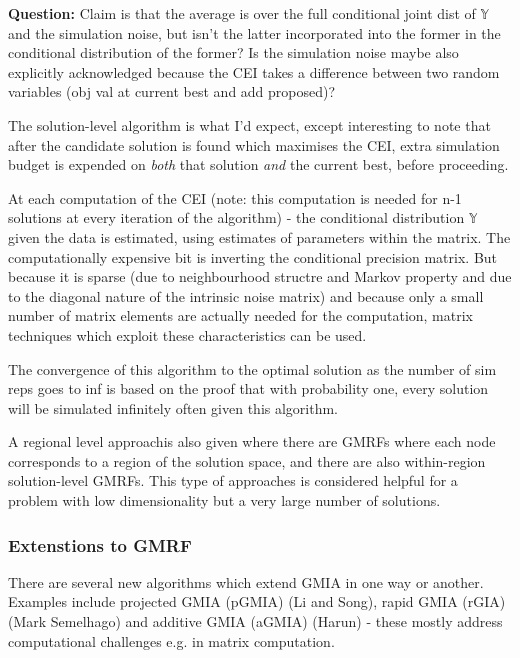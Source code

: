 \documentclass{article}
\begin{document}
\textbf{Question: } Claim is that the average is over the full conditional joint dist of $\mathbb{Y}$ and the simulation noise, but isn't the latter incorporated into the former in the conditional distribution of the former? Is the simulation noise maybe also explicitly acknowledged because the CEI takes a difference between two random variables (obj val at current best and add proposed)? \newline

The solution-level algorithm is what I'd expect, except interesting to note that after the candidate solution is found which maximises the CEI, extra simulation budget is expended on \emph{both} that solution \emph{and} the current best, before proceeding. \newline

At each computation of the CEI (note: this computation is needed for n-1 solutions at every iteration of the algorithm) - the conditional distribution $\mathbb{Y}$ given the data is estimated, using estimates of parameters within the matrix. The computationally expensive bit is inverting the conditional precision matrix. But because it is sparse (due to neighbourhood structre and Markov property and due to the diagonal nature of the intrinsic noise matrix) and because only a small number of matrix elements are actually needed for the computation, matrix techniques which exploit these characteristics can be used. \newline

The convergence of this algorithm to the optimal solution as the number of sim reps goes to inf is based on the proof that with probability one, every solution will be simulated infinitely often given this algorithm.  \newline

A regional level approachis also given where there are GMRFs where each node corresponds to a region of the solution space, and there are also within-region solution-level GMRFs. This type of approaches is considered helpful for a problem with low dimensionality but a very large number of solutions. \newline

\subsubsection{Extenstions to GMRF}

There are several new algorithms which extend GMIA in one way or another. Examples include projected GMIA (pGMIA) (Li and Song), rapid GMIA (rGIA) (Mark Semelhago) and additive GMIA (aGMIA) (Harun) - these mostly address computational challenges e.g. in matrix computation.
\end{document}
